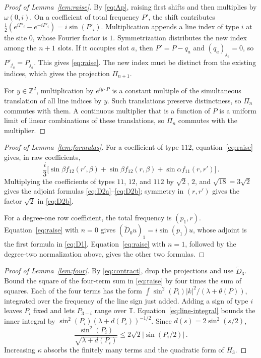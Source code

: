\documentclass[11pt]{amsart}
\theoremstyle{plain}
\theoremstyle{definition}
\newcommand{\Z}{\mathbb Z}
\newcommand{\T}{\mathbb T}
\newcommand{\1}{\mathbf 1}
\newcommand{\abs}[1]{\lvert #1\rvert}
\begin{document}
\begin{proof}[Proof of Lemma~\ref{lem:raise}]
By \eqref{eq:Ap}, raising first shifts and then multiplies by
$\omega(0,i)$.  On a coefficient of total frequency $P'$, the shift
contributes
$\tfrac12(e^{iP'_i}-e^{-iP'_i})=i\sin(P'_i)$.  Multiplication appends a line
index of type $i$ at the site $0$, whose Fourier factor is $1$.
Symmetrization distributes the new index among the $n+1$ slots.  If it
occupies slot $a$, then $P'=P-q_a$ and $(q_a)_{j_a}=0$, so
$P'_{j_a}=P_{j_a}$.  This gives \eqref{eq:raise}.  The new index must be
distinct from the existing indices, which gives the projection $\Pi_{n+1}$.

For $y\in\Z^2$, multiplication by $e^{iy\cdot P}$ is a constant multiple of the simultaneous translation of all line indices by $y$.
Such translations preserve distinctness, so $\Pi_n$ commutes with them.  A continuous multiplier that is a function of $P$ is a
uniform limit of linear combinations of these translations, so $\Pi_n$ commutes with the multiplier.
\end{proof}

\begin{proof}[Proof of Lemma~\ref{lem:formulas}]
For a coefficient of type $112$, equation~\eqref{eq:raise} gives, in raw
coefficients,
\[
  \frac i3\bigl[\sin\beta f_{12}(r',\beta)
  +\sin\beta f_{12}(r,\beta)+\sin\alpha f_{11}(r,r')\bigr]\, .
\]
Multiplying the coefficients of types $11$, $12$, and $112$ by
$\sqrt2$, $2$, and $\sqrt{18}=3\sqrt2$ gives the adjoint formulas
\eqref{eq:D2a}--\eqref{eq:D2b}; symmetry in $(r,r')$ gives the factor
$\sqrt2$ in \eqref{eq:D2b}.

For a degree-one row coefficient, the total frequency is $(p_1,r)$.
Equation~\eqref{eq:raise} with $n=0$ gives
$(\widetilde D_0u)_1=i\sin(p_1)u$, whose adjoint is the first formula in
\eqref{eq:D1}.  Equation~\eqref{eq:raise} with $n=1$, followed by the
degree-two normalization above, gives the other two formulas.
\end{proof}

\begin{proof}[Proof of Lemma~\ref{lem:four}]
By \eqref{eq:contract}, drop the projections and use $\widetilde D_3$.
Bound the square of the four-term sum in \eqref{eq:raise} by four times the
sum of squares.  Each of the four terms has the form
$\int\sin^2(P_i)\abs k^2/(\lambda+\theta(P))$, integrated over the frequency
of the line sign just added.  Adding a sign of type $i$ leaves $P_i$ fixed
and lets $P_{3-i}$ range over $\T$.  Equation~\eqref{eq:line-integral} bounds the inner
integral by $\sin^2(P_i)(\lambda+d(P_i))^{-1/2}$.  Since
$d(s)=2\sin^2(s/2)$,
\[
  \frac{\sin^2(P_i)}{\sqrt{\lambda+d(P_i)}}
  \leq2\sqrt2\abs{\sin(P_i/2)}\, .
\]
Increasing $\kappa$ absorbs the finitely many terms and the quadratic form of
$H_3$.
\end{proof}
\end{document}
